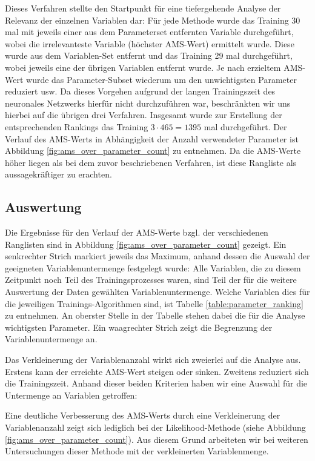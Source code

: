 Dieses Verfahren stellte den Startpunkt für eine tiefergehende Analyse der Relevanz der einzelnen Variablen dar: Für jede Methode wurde das Training 30 mal mit jeweils einer aus dem Parameterset entfernten Variable durchgeführt, wobei die irrelevanteste Variable (höchster AMS-Wert) ermittelt wurde. Diese wurde aus dem Variablen-Set entfernt und das Training 29 mal durchgeführt, wobei jeweils eine der übrigen Variablen entfernt wurde. Je nach erzieltem AMS-Wert wurde das Parameter-Subset wiederum um den unwichtigsten Parameter reduziert usw. Da dieses Vorgehen aufgrund der langen Trainingszeit des neuronales Netzwerks hierfür nicht durchzuführen war, beschränkten wir uns hierbei auf die übrigen drei Verfahren. Insgesamt wurde zur Erstellung der entsprechenden Rankings das Training $3\cdot465=1395$ mal durchgeführt. Der Verlauf des AMS-Werts in Abhängigkeit der Anzahl verwendeter Parameter ist  Abbildung \ref{fig:ams_over_parameter_count} zu entnehmen. Da die AMS-Werte höher liegen als bei dem zuvor beschriebenen Verfahren, ist diese Rangliste als aussagekräftiger zu erachten.


\subsection{Auswertung}

Die Ergebnisse für den Verlauf der AMS-Werte bzgl. der verschiedenen Ranglisten sind in Abbildung \ref{fig:ams_over_parameter_count} gezeigt. Ein senkrechter Strich markiert jeweils das Maximum, anhand dessen die Auswahl der geeigneten Variablenuntermenge festgelegt wurde: Alle Variablen, die zu diesem Zeitpunkt noch Teil des Trainingsprozesses waren, sind Teil der für die weitere Auswertung der Daten gewählten Variablenuntermenge. Welche Variablen dies für die jeweiligen Trainings-Algorithmen sind, ist Tabelle \ref{table:parameter_ranking} zu entnehmen. An oberster Stelle in der Tabelle stehen dabei die für die Analyse wichtigsten Parameter. Ein waagrechter Strich zeigt die Begrenzung der Variablenuntermenge an. 

Das Verkleinerung der Variablenanzahl wirkt sich zweierlei auf die Analyse aus. Erstens kann der erreichte AMS-Wert steigen oder sinken. Zweitens reduziert sich die Trainingszeit. Anhand dieser beiden Kriterien haben wir eine Auswahl für die Untermenge an Variablen getroffen:

Eine deutliche Verbesserung des AMS-Werts durch eine Verkleinerung der Variablenanzahl zeigt sich lediglich bei der Likelihood-Methode (siehe Abbildung \ref{fig:ams_over_parameter_count}). Aus diesem Grund arbeiteten wir bei weiteren Untersuchungen dieser Methode mit der verkleinerten Variablenmenge.

